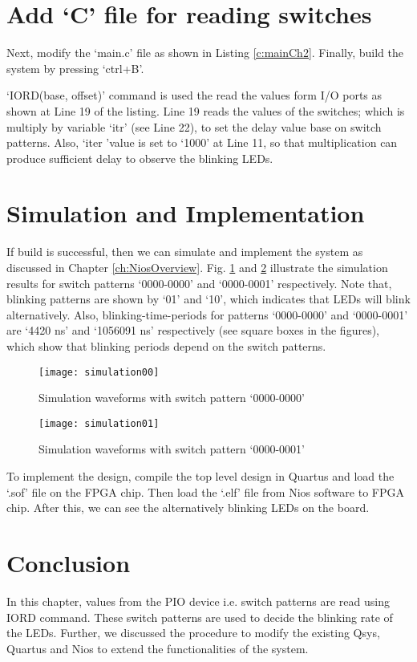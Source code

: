 \section{Add `C' file for reading switches}
Next, modify the `main.c' file as shown in Listing \ref{c:mainCh2}. Finally, build the system by pressing `ctrl+B'. 

\begin{explanation}
`IORD(base, offset)' command is used the read the values form I/O ports as shown at Line 19 of the listing. Line 19 reads the values of the switches; which is multiply by variable `itr' (see Line 22), to set the delay value base on switch patterns. Also, `iter 'value is set to `1000' at Line 11, so that multiplication can produce sufficient delay to observe the blinking LEDs.
\end{explanation}


	
\section{Simulation and Implementation}
If build is successful, then we can simulate and implement the system as discussed in Chapter \ref{ch:NiosOverview}. Fig. \ref{fig:simulation00} and \ref{fig:simulation01} illustrate the simulation results for switch patterns `0000-0000' and `0000-0001' respectively. Note that, blinking patterns are shown by `01' and `10', which indicates that LEDs will blink alternatively. Also, blinking-time-periods for patterns `0000-0000' and `0000-0001' are `4420 ns' and `1056091 ns' respectively (see square boxes in the figures), which show that blinking periods depend on the switch patterns. 
	
\begin{figure}[!h]
	\centering
	\texttt{[image: simulation00]}
	\caption{Simulation waveforms with switch pattern `0000-0000'}
	\label{fig:simulation00}
\end{figure}
\begin{figure}[!h]
	\centering
	\texttt{[image: simulation01]}
	\caption{Simulation waveforms with switch pattern `0000-0001'}
	\label{fig:simulation01}
\end{figure}	
	
To implement the design, compile the top level design in Quartus and load the `.sof' file on the FPGA chip. Then load the `.elf' file from Nios software to FPGA chip. After this, we can see the alternatively blinking LEDs on the board. 

\section{Conclusion}
In this chapter, values from the PIO device i.e. switch patterns are read using IORD command. These switch patterns are used to decide the blinking rate of the LEDs. Further, we discussed the procedure to modify the existing Qsys, Quartus and Nios to extend the functionalities of the system. 


